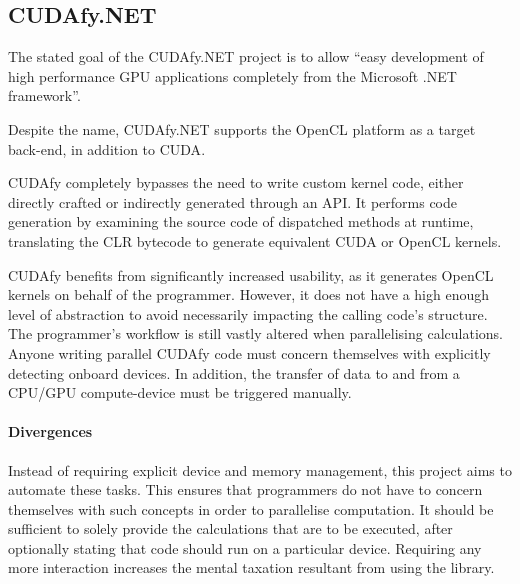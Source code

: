\subsection{CUDAfy.NET}
The stated goal of the CUDAfy.NET\cite{cudafy} project is to allow ``easy development of high performance \ac{GPU} applications completely from the Microsoft .NET framework''.

Despite the name, CUDAfy.NET supports the \ac{OpenCL} platform as a target back-end, in addition to \ac{CUDA}.

CUDAfy completely bypasses the need to write custom kernel code, either directly crafted or indirectly generated through an API. It performs code generation by examining the source code of dispatched methods at runtime, translating the \ac{CLR} bytecode to generate equivalent \ac{CUDA} or \ac{OpenCL} kernels.

CUDAfy benefits from significantly increased usability, as it generates \ac{OpenCL} kernels on behalf of the programmer. However, it does not have a high enough level of abstraction to avoid necessarily impacting the calling code's structure. The programmer's workflow is still vastly altered when parallelising calculations. Anyone writing parallel CUDAfy code must concern themselves with explicitly detecting onboard devices. In addition, the transfer of data to and from a \ac{CPU}/\ac{GPU} compute-device must be triggered manually.

\paragraph*{Divergences}
Instead of requiring explicit device and memory management, this project aims to automate these tasks. This ensures that programmers do not have to concern themselves with such concepts in order to parallelise computation. It should be sufficient to solely provide the calculations that are to be executed, after optionally stating that code should run on a particular device. Requiring any more interaction increases the mental taxation resultant from using the library.
